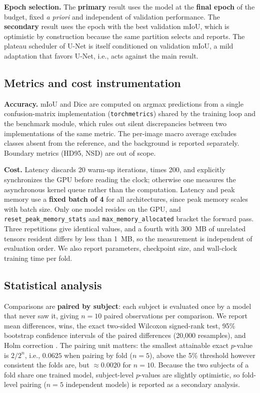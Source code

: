 \textbf{Epoch selection.}
The \textbf{primary} result uses the model at the \textbf{final epoch} of the budget, fixed \textit{a priori} and independent of validation performance.
The \textbf{secondary} result uses the epoch with the best validation mIoU, which is optimistic by construction because the same partition selects and reports.
The plateau scheduler of U-Net is itself conditioned on validation mIoU, a mild adaptation that favors U-Net, i.e., acts against the main result.

\subsection{Metrics and cost instrumentation} \label{subsec:metricas_acuracia}

\textbf{Accuracy.} mIoU and Dice are computed on argmax predictions from a single confusion-matrix implementation (\texttt{torchmetrics}) shared by the training loop and the benchmark module, which rules out silent discrepancies between two implementations of the same metric.
The per-image macro average excludes classes absent from the reference, and the background is reported separately.
Boundary metrics (HD95, NSD) are out of scope.

\textbf{Cost.} Latency discards 20 warm-up iterations, times 200, and explicitly synchronizes the GPU before reading the clock; otherwise one measures the asynchronous kernel queue rather than the computation.
Latency and peak memory use a \textbf{fixed batch of 4} for all architectures, since peak memory scales with batch size.
Only one model resides on the GPU, and \texttt{reset\_peak\_memory\_stats} and \texttt{max\_memory\_allocated} bracket the forward pass.
Three repetitions give identical values, and a fourth with 300~MB of unrelated tensors resident differs by less than 1~MB, so the measurement is independent of evaluation order.
We also report parameters, checkpoint size, and wall-clock training time per fold.

\subsection{Statistical analysis} \label{sec:analise_estatistica}

Comparisons are \textbf{paired by subject}: each subject is evaluated once by a model that never saw it, giving $n=10$ paired observations per comparison.
We report mean differences, wins, the exact two-sided Wilcoxon signed-rank test, 95\% bootstrap confidence intervals of the paired differences (20{,}000 resamples), and Holm correction \cite{Holm1979}.
The pairing unit matters: the smallest attainable exact $p$-value is $2/2^{n}$, i.e., $0.0625$ when pairing by fold ($n=5$), above the 5\% threshold however consistent the folds are, but $\approx0.0020$ for $n=10$.
Because the two subjects of a fold share one trained model, subject-level $p$-values are slightly optimistic, so fold-level pairing ($n=5$ independent models) is reported as a secondary analysis.

